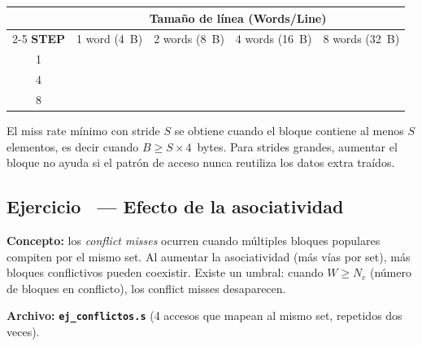 \documentclass[12pt, a4paper]{article}
\newcommand{\archivo}[1]{\texttt{\textbf{#1}}}
\newcounter{ejnum}
\newcommand{\ejerciciosec}[1]{%
  \stepcounter{ejnum}%
  \subsection{Ejercicio \theejnum\ — #1}%
}
\begin{document}
\vspace{0.2cm}
\begin{center}
\renewcommand{\arraystretch}{1.8}
\begin{tabular}{|c|c|c|c|c|}
    \hline
    & \multicolumn{4}{c|}{\textbf{Tamaño de línea (Words/Line)}} \\
    \cline{2-5}
    \textbf{STEP} & 1 word (4~B) & 2 words (8~B) & 4 words (16~B) & 8 words (32~B) \\
    \hline
    1 & & & & \\
    \hline
    4 & & & & \\
    \hline
    8 & & & & \\
    \hline
\end{tabular}
\end{center}

\begin{conclusion}
    El miss rate mínimo con stride $S$ se obtiene cuando el bloque contiene al menos
    $S$ elementos, es decir cuando $B \geq S \times 4$~bytes.
    Para strides grandes, aumentar el bloque no ayuda si el patrón de acceso
    nunca reutiliza los datos extra traídos.
\end{conclusion}

\newpage

\ejerciciosec{Efecto de la asociatividad}

\textbf{Concepto:} los \textit{conflict misses} ocurren cuando múltiples bloques
populares compiten por el mismo set. Al aumentar la asociatividad (más vías por set),
más bloques conflictivos pueden coexistir. Existe un umbral: cuando $W \geq N_c$
(número de bloques en conflicto), los conflict misses desaparecen.

\textbf{Archivo:} \archivo{ej\_conflictos.s}
(4 accesos que mapean al mismo set, repetidos dos veces).
\end{document}
